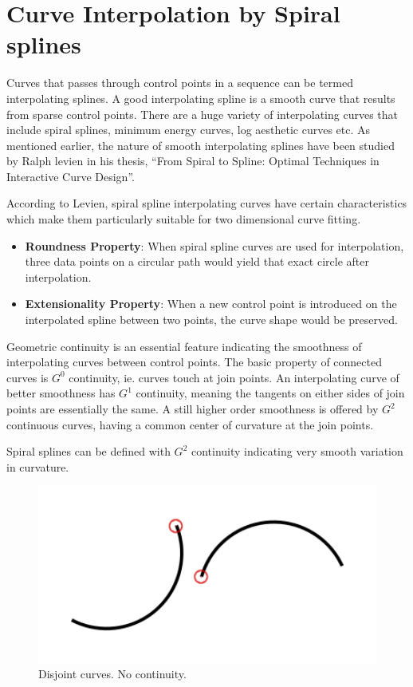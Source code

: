 \documentclass[11pt,twoside,a4paper,parskip=full]{scrartcl}
\begin{document}
\section{Curve Interpolation by Spiral splines}

Curves that passes through control points in a sequence can be termed interpolating splines. A good interpolating spline is a smooth curve that results from sparse control points. There are a huge variety of interpolating curves that include spiral splines, minimum energy curves, log aesthetic curves etc. As mentioned earlier, the nature of smooth interpolating splines have been studied by Ralph levien in his thesis, ``From Spiral to Spline: Optimal Techniques in Interactive Curve Design”\cite{levien}.

According to Levien, spiral spline interpolating curves have certain characteristics which make them particularly suitable for two dimensional curve fitting.
\begin{itemize}
	
	\item \textbf{Roundness Property}: When spiral spline curves are used for interpolation, three data points on a circular path would yield that exact circle after interpolation.
	\item \textbf{Extensionality Property}: When a new control point is introduced on the interpolated spline between two points, the curve shape would be preserved.
\end{itemize}

Geometric continuity is an essential feature indicating the smoothness of interpolating curves between control points. The basic property of connected curves is $G^0$ continuity, ie. curves touch at join points. An interpolating curve of better smoothness has $G^1$ continuity, meaning the tangents on either sides of join points are essentially the same. A still higher order smoothness is offered by $G^2$ continuous curves, having a common center of curvature at the join points. 

Spiral splines can be defined with $G^2$ continuity indicating very smooth variation in curvature. 

\begin{figure}[h!]
	\includegraphics[width=1.0\textwidth]{images/disjoint.png}
	\caption{Disjoint curves. No continuity.}
	\label{disjoint}
\end{figure}
\end{document}
